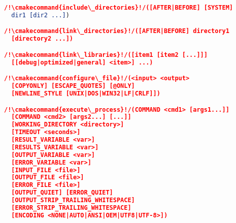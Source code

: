 \documentclass{article}
\newcommand{\cmakecommand}[1]{{\href{https://cmake.org/cmake/help/v3.20/command/#1.html}{#1}}}
\begin{document}
\begin{minipage}[t]{0.18\linewidth}
\begin{lstlisting}[language=CMake]
/!\cmakecommand{include\_directories}!/([AFTER|BEFORE] [SYSTEM]
  dir1 [dir2 ...])

/!\cmakecommand{link\_directories}!/([AFTER|BEFORE] directory1
  [directory2 ...])

/!\cmakecommand{link\_libraries}!/([item1 [item2 [...]]]
  [[debug|optimized|general] <item>] ...)

/!\cmakecommand{configure\_file}!/(<input> <output>
  [COPYONLY] [ESCAPE_QUOTES] [@ONLY]
  [NEWLINE_STYLE [UNIX|DOS|WIN32|LF|CRLF]])

/!\cmakecommand{execute\_process}!/(COMMAND <cmd1> [args1...]]
  [COMMAND <cmd2> [args2...] [...]]
  [WORKING_DIRECTORY <directory>]
  [TIMEOUT <seconds>]
  [RESULT_VARIABLE <var>]
  [RESULTS_VARIABLE <var>]
  [OUTPUT_VARIABLE <var>]
  [ERROR_VARIABLE <var>]
  [INPUT_FILE <file>]
  [OUTPUT_FILE <file>]
  [ERROR_FILE <file>]
  [OUTPUT_QUIET] [ERROR_QUIET]
  [OUTPUT_STRIP_TRAILING_WHITESPACE]
  [ERROR_STRIP_TRAILING_WHITESPACE]
  [ENCODING <NONE|AUTO|ANSI|OEM|UTF8|UTF-8>])
\end{lstlisting}
\end{minipage}
\hfill\vline\hfill
\end{document}
